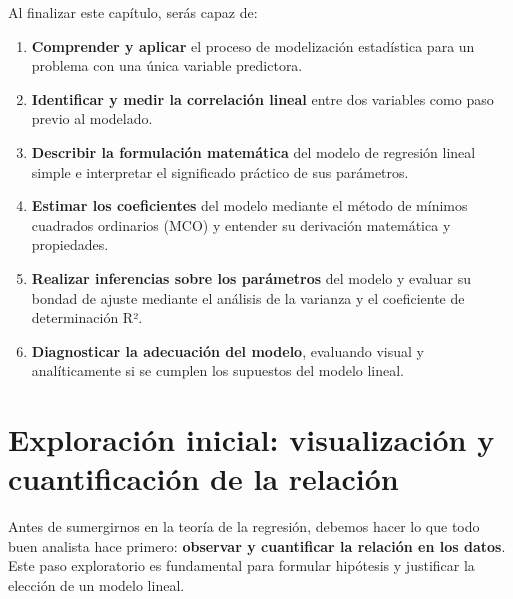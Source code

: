 \documentclass[
  letterpaper,
  DIV=11,
  numbers=noendperiod]{scrreprt}
\providecommand{\tightlist}{%
  \setlength{\itemsep}{0pt}\setlength{\parskip}{0pt}}
\begin{document}
\begin{tcolorbox}[enhanced jigsaw, leftrule=.75mm, breakable, colbacktitle=quarto-callout-important-color!10!white, bottomrule=.15mm, colframe=quarto-callout-important-color-frame, toprule=.15mm, colback=white, coltitle=black, bottomtitle=1mm, left=2mm, title=\textcolor{quarto-callout-important-color}{\faExclamation}\hspace{0.5em}{Objetivos de aprendizaje}, opacityback=0, arc=.35mm, opacitybacktitle=0.6, toptitle=1mm, titlerule=0mm, rightrule=.15mm]

Al finalizar este capítulo, serás capaz de:

\begin{enumerate}
\def\labelenumi{\arabic{enumi}.}
\tightlist
\item
  \textbf{Comprender y aplicar} el proceso de modelización estadística
  para un problema con una única variable predictora.
\item
  \textbf{Identificar y medir la correlación lineal} entre dos variables
  como paso previo al modelado.
\item
  \textbf{Describir la formulación matemática} del modelo de regresión
  lineal simple e interpretar el significado práctico de sus parámetros.
\item
  \textbf{Estimar los coeficientes} del modelo mediante el método de
  mínimos cuadrados ordinarios (MCO) y entender su derivación matemática
  y propiedades.
\item
  \textbf{Realizar inferencias sobre los parámetros} del modelo y
  evaluar su bondad de ajuste mediante el análisis de la varianza y el
  coeficiente de determinación R².
\item
  \textbf{Diagnosticar la adecuación del modelo}, evaluando visual y
  analíticamente si se cumplen los supuestos del modelo lineal.
\end{enumerate}

\end{tcolorbox}

\section{Exploración inicial: visualización y cuantificación de la
relación}\label{exploraciuxf3n-inicial-visualizaciuxf3n-y-cuantificaciuxf3n-de-la-relaciuxf3n}

Antes de sumergirnos en la teoría de la regresión, debemos hacer lo que
todo buen analista hace primero: \textbf{observar y cuantificar la
relación en los datos}. Este paso exploratorio es fundamental para
formular hipótesis y justificar la elección de un modelo lineal.
\end{document}
